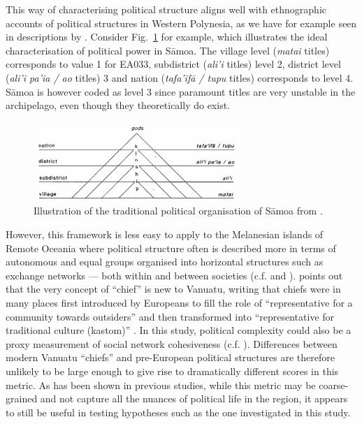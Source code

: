 \documentclass[unnumsec,webpdf,modern,medium]{oup-authoring-template}
\begin{document}
This way of characterising political structure aligns well with ethnographic accounts of political structures in Western Polynesia, as we have for example seen in descriptions by \citet{sahlins63}. Consider Fig.~\ref{appendix_meleiseapyramid} \citep[22]{meleisea1995} for example, which illustrates the ideal characterisation of political power in S\={a}moa. The village level (\emph{matai} titles) corresponds to value 1 for EA033, subdistrict (\emph{ali'i} titles) level 2, district level (\emph{ali'i pa'ia / ao} titles) 3 and nation (\emph{tafa'if\={a} / tupu} titles) corresponds to level 4. S\={a}moa is however coded as level 3 since paramount titles are very unstable in the archipelago, even though they theoretically do exist.


\begin{figure}[ht]
\centering
\includegraphics[width=0.7\textwidth]{pyramid_meleisea}
\caption[Illustration of traditional political organisation of S\={a}moa.]{{Illustration of the traditional political organisation of S\={a}moa from \citet[22]{meleisea1995}.}}
\label{appendix_meleiseapyramid}
\end{figure}

However, this framework is less easy to apply to the Melanesian islands of Remote Oceania where political structure often is described more in terms of autonomous and equal groups organised into horizontal structures such as exchange networks --- both within and between societies (c.f. \citet{bonnemaison1996graded} and \citet{huffman1996trading}). \citet{bolton1998chief} points out that the very concept of ``chief'' is new to Vanuatu, writing that chiefs were in many places first introduced by Europeans to fill the role of ``representative for a community towards outsiders'' and then transformed into ``representative for traditional culture (kastom)'' \citep[185]{bolton1998chief}. In this study, political complexity could also be a proxy measurement of social network cohesiveness (c.f. \citet{grace_1992_aberrant}). Differences between modern Vanuatu ``chiefs'' and pre-European political structures are therefore unlikely to be large enough to give rise to dramatically different scores in this metric. As has been shown in previous studies, while this metric may be coarse-grained and not capture all the nuances of political life in the region, it appears to still be useful in testing hypotheses such as the one investigated in this study.
\end{document}
